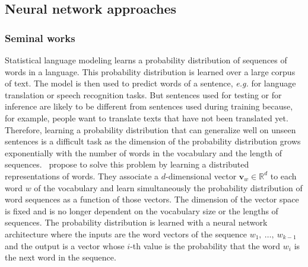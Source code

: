   \subsection{Neural network approaches}
    \label{ch03:subsec:neural-network}
    \subsubsection{Seminal works}
      Statistical language modeling learns a probability distribution of
      sequences of words in a language. This probability distribution is learned
      over a large corpus of text. The model is then used to predict words of a
      sentence, \textit{e.g.} for language translation or speech recognition
      tasks. But sentences used for testing or for inference are likely to be
      different from sentences used during training because, for example, people
      want to translate texts that have not been translated yet. Therefore,
      learning a probability distribution that can generalize well on unseen
      sentences is a difficult task as the dimension of the probability
      distribution grows exponentially with the number of words in the
      vocabulary and the length of sequences.~\citeauthor{bengio2003neural}
      \citep{bengio2003neural} propose to solve this problem by learning a
      distributed representations of words.  They associate a $d$-dimensional
      vector $\mathbf{v}_w \in \mathbb{R}^d$ to each word $w$ of the vocabulary
      and learn simultaneously the probability distribution of word sequences as
      a function of those vectors. The dimension of the vector space is fixed
      and is no longer dependent on the vocabulary size or the lengths of
      sequences. The probability distribution is learned with a neural network
      architecture where the inputs are the word vectors of the sequence
      $w_1,~\dots,~w_{k-1}$ and the output is a vector whose $i$-th value is the
      probability that the word $w_i$ is the next word in the sequence. \medskip

